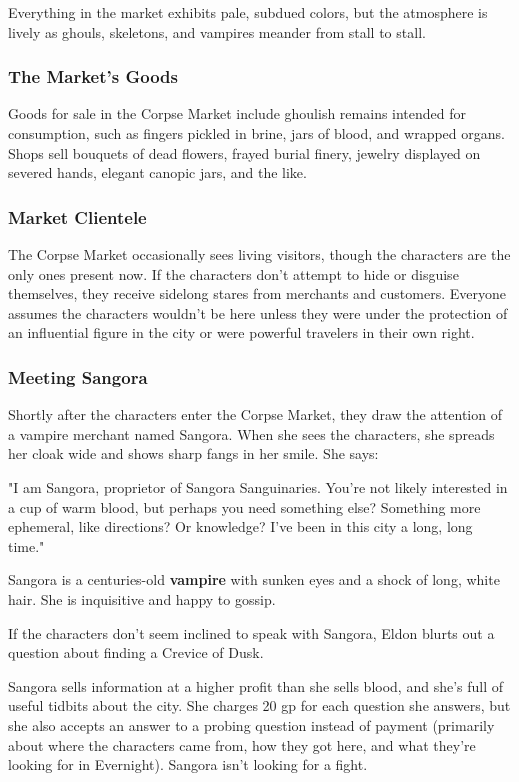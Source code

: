 \documentclass[10pt,a4paper,twoside,bg=print,twocolumn,openany,nodeprecatedcode]{dndbook}
\begin{document}
Everything in the market exhibits pale, subdued colors, but the atmosphere is lively as ghouls, skeletons, and vampires meander from stall to stall.

\subsubsection{The Market's Goods}
Goods for sale in the Corpse Market include ghoulish remains intended for consumption, such as fingers pickled in brine, jars of blood, and wrapped organs. Shops sell bouquets of dead flowers, frayed burial finery, jewelry displayed on severed hands, elegant canopic jars, and the like.

\subsubsection{Market Clientele}
The Corpse Market occasionally sees living visitors, though the characters are the only ones present now. If the characters don't attempt to hide or disguise themselves, they receive sidelong stares from merchants and customers. Everyone assumes the characters wouldn't be here unless they were under the protection of an influential figure in the city or were powerful travelers in their own right.

\subsubsection{Meeting Sangora}
Shortly after the characters enter the Corpse Market, they draw the attention of a vampire merchant named Sangora. When she sees the characters, she spreads her cloak wide and shows sharp fangs in her smile. She says:

\begin{DndReadAloud}{}
"I am Sangora, proprietor of Sangora Sanguinaries. You're not likely interested in a cup of warm blood, but perhaps you need something else? Something more ephemeral, like directions? Or knowledge? I've been in this city a long, long time."

\end{DndReadAloud}

Sangora is a centuries-old \textbf{vampire} with sunken eyes and a shock of long, white hair. She is inquisitive and happy to gossip.

If the characters don't seem inclined to speak with Sangora, Eldon blurts out a question about finding a Crevice of Dusk.

Sangora sells information at a higher profit than she sells blood, and she's full of useful tidbits about the city. She charges 20 gp for each question she answers, but she also accepts an answer to a probing question instead of payment (primarily about where the characters came from, how they got here, and what they're looking for in Evernight). Sangora isn't looking for a fight.
\end{document}
